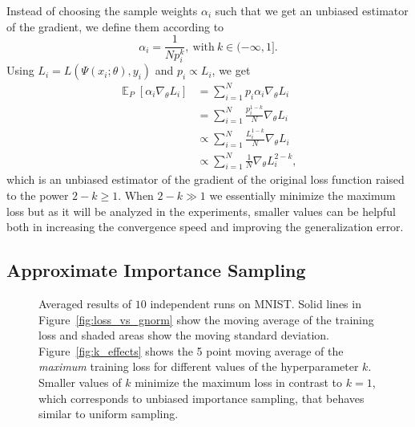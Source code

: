\documentclass{article}
\DeclareMathOperator{\Exp}{\mathbb{E}}
\newcommand{\E}[2][]{\Exp_{#1}\left[ #2 \right]}
\begin{document}
Instead of choosing the sample weights $\alpha_i$ such that we
get an unbiased estimator of the gradient, we define them according to
\begin{equation} \label{eq:biased_weights}
\alpha_i = \frac{1}{N p_i^k}, \ \text{with} \ k \in (-\infty, 1].
\end{equation}
Using $L_i = L(\Psi(x_i; \theta), y_i)$ and $p_i \propto L_i$, we get
\begin{align}
\E[P]{\alpha_i \nabla_{\theta} L_i}
%
& = \sum_{i=1}^N p_i \alpha_i \nabla_{\theta} L_i \\
%
& = \sum_{i=1}^N \frac{p_i^{1-k}}{N} \nabla_{\theta} L_i \\
& \propto \sum_{i=1}^N \frac{ L_i^{1-k}}{N} \nabla_{\theta} L_i \\
%
& \propto \sum_{i=1}^N \frac{1}{N} \nabla_{\theta} L_i^{2-k}, \label{eq:soft_max_loss}
\end{align}
which is an unbiased estimator of the gradient of the original loss
function raised to the power $2-k \geq 1$. When $2-k \gg 1$ we essentially
minimize the maximum loss but as it will be analyzed in the experiments,
smaller values can be helpful both in increasing the convergence speed and
improving the generalization error.

\subsection{Approximate Importance Sampling} \label{sec:approx_is}

\begin{figure*}
    \caption{Averaged results of $10$ independent runs on MNIST. Solid lines in
    Figure~\ref{fig:loss_vs_gnorm} show the moving average of the training loss
    and shaded areas show the moving standard deviation.
    Figure~\ref{fig:k_effects} shows the 5 point moving average of the
    \emph{maximum} training loss for different values of the hyperparameter
    $k$. Smaller values of $k$ minimize the maximum loss in contrast to $k=1$,
    which corresponds to unbiased importance sampling, that behaves similar to
    uniform sampling.} \label{fig:mnist}
\end{figure*}
\end{document}
